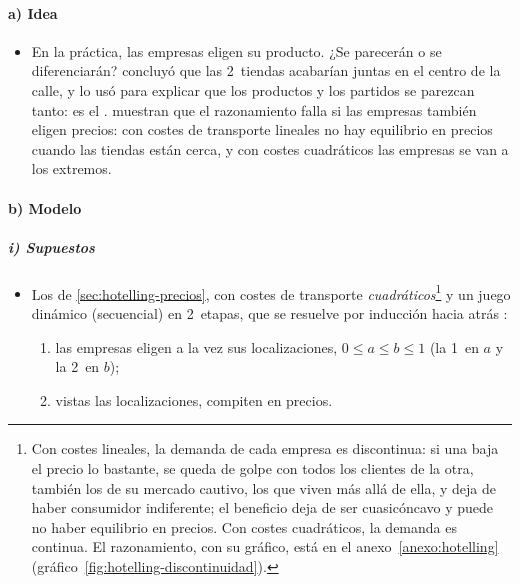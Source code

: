 \documentclass[11pt]{article}
\begin{document}
\paragraph{a) Idea}

\begin{itemize}
\item En la práctica, las empresas eligen su producto. ¿Se parecerán o se diferenciarán? \textcite{Hotelling1929Stability} concluyó que las 2~tiendas acabarían juntas en el centro de la calle, y lo usó para explicar que los productos y los partidos se parezcan tanto: es el . \textcite{dAspremontGabszewiczThisse1979Hotelling} muestran que el razonamiento falla si las empresas también eligen precios: con costes de transporte lineales no hay equilibrio en precios cuando las tiendas están cerca, y con costes cuadráticos las empresas se van a los extremos.
\end{itemize}

\paragraph{b) Modelo}

\subparagraph{i) Supuestos}

\begin{itemize}
\item Los de \ref{sec:hotelling-precios}, con costes de transporte \emph{cuadráticos}\footnote{Con costes lineales, la demanda de cada empresa es discontinua: si una baja el precio lo bastante, se queda de golpe con todos los clientes de la otra, también los de su mercado cautivo, los que viven más allá de ella, y deja de haber consumidor indiferente; el beneficio deja de ser cuasicóncavo y puede no haber equilibrio en precios\nocite{dAspremontGabszewiczThisse1979Hotelling}. Con costes cuadráticos, la demanda es continua. El razonamiento, con su gráfico, está en el anexo~\ref{anexo:hotelling} (gráfico~\ref{fig:hotelling-discontinuidad}).} y un juego dinámico (secuencial) en 2~etapas, que se resuelve por inducción hacia atrás :
  \begin{enumerate}
  \item las empresas eligen a la vez sus localizaciones, $0\le a\le b\le1$ (la 1~en $a$ y la 2~en $b$);
  \item vistas las localizaciones, compiten en precios.
  \end{enumerate}
\end{itemize}
\end{document}
